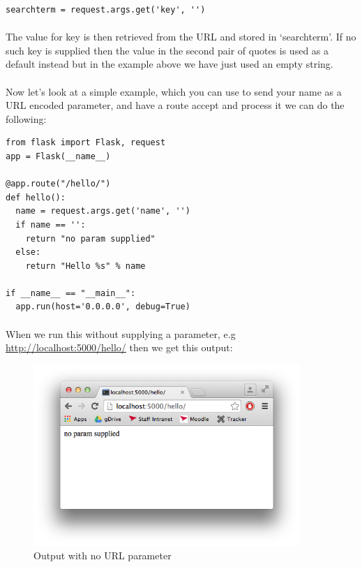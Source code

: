 \documentclass[12pt, a4paper, twoside]{book}
\begin{document}
\begin{lstlisting}
searchterm = request.args.get('key', '')
\end{lstlisting}

\paragraph{} The value for key is then retrieved from the URL and stored in `searchterm'. If no such key is supplied then the value in the second pair of quotes is used as a default instead but in the example above we have just used an empty string.

\paragraph{} Now let's look at a simple example, which you can use to send your name as a URL encoded parameter, and have a route accept and process it we can do the following:

\begin{lstlisting}
from flask import Flask, request
app = Flask(__name__)

@app.route("/hello/")
def hello():
  name = request.args.get('name', '')
  if name == '':
    return "no param supplied"
  else:
    return "Hello %s" % name

if __name__ == "__main__":
  app.run(host='0.0.0.0', debug=True)
\end{lstlisting}

\paragraph{} When we run this without supplying a parameter, e.g \url{http://localhost:5000/hello/} then we get this output:

\begin{figure}[H]
\centering
\includegraphics[width=0.9\textwidth]{images/flask-url-param-empty.png}
\caption{Output with no URL parameter}
\label{fig:flask-url-param-empty}
\end{figure}
\end{document}

